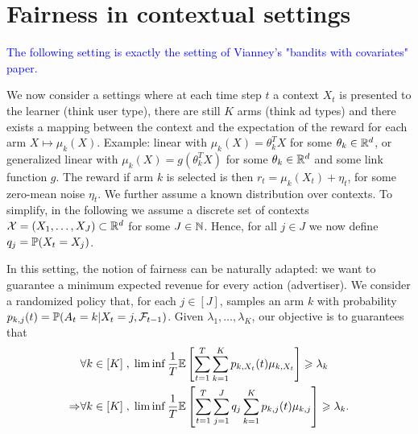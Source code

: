 \section{Fairness in contextual settings}\label{app::contextual}

\textcolor{blue}{The following setting is exactly the setting of Vianney's "bandits with covariates" paper.}

We now consider a settings where at each time step $t$ a context $X_t$ is presented to the learner (think user type), there are still $K$ arms (think ad types) and there exists a mapping between the context and the expectation of the reward for each arm $X \mapsto \mu_k(X)$. Example: linear with $\mu_k(X)=\theta_k^T X$ for some $\theta_k \in \mathbb{R}^d$, or generalized linear with $\mu_k(X)=g(\theta_k^T X)$ for some $\theta_k \in \mathbb{R}^d$ and some link function $g$. The reward if arm $k$ is selected is then $r_t=\mu_k(X_t)+\eta_t$, for some zero-mean noise $\eta_t$. We further assume a known distribution over contexts. To simplify, in the following we assume a discrete set of contexts $\mathcal{X}=(X_1,\dots, X_J) \subset \mathbb{R}^d$ for some $J\in \mathbb{N}$. Hence, for all $j \in J$ we now define $q_j = \mathbb{P}(X_t=X_j)$.

In this setting, the notion of fairness can be naturally adapted: we want to guarantee a minimum expected revenue for every action (advertiser). We consider a randomized policy that, for each $j \in [J]$, samples an arm $k$ with probability $p_{k, j}(t) = \mathbb{P}(A_t=k|X_t=j, \mathcal{F}_{t-1})$. Given $\lambda_1, \dots, \lambda_K$, our objective is to guarantees that 
\begin{align*}
&\forall k \in [K]\;, \; \liminf \frac{1}{T}\mathbb{E}\left[\sum_{t=1}^T \sum_{k=1}^K p_{k,X_t}(t)\mu_{k, X_t}\right] \geqslant \lambda_k\\ \Rightarrow &\forall k \in [K]\;, \; \liminf \frac{1}{T}\mathbb{E}\left[\sum_{t=1}^T \sum_{j=1}^J q_j \sum_{k=1}^K p_{k,j}(t)\mu_{k, j}\right] \geqslant \lambda_k . \end{align*}

